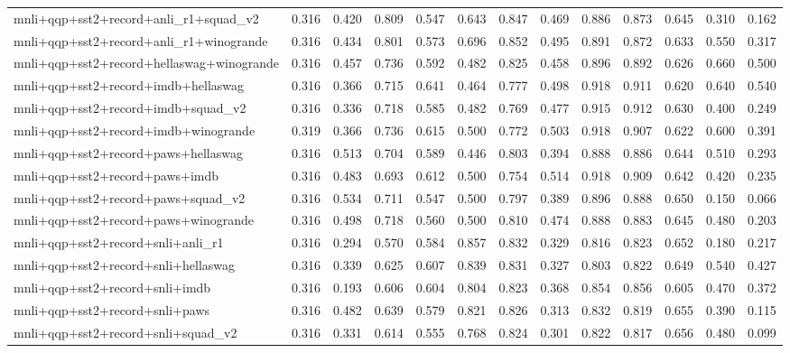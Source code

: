 \begin{table}[t]
\begin{tabular}{lrrrrrrrrrrrr}
    mnli+qqp+sst2+record+anli\_r1+squad\_v2 & 0.316 & 0.420 & 0.809 & 0.547 & 0.643 & 0.847 & 0.469 & 0.886 & 0.873 & 0.645 & 0.310 & 0.162 \\
    mnli+qqp+sst2+record+anli\_r1+winogrande & 0.316 & 0.434 & 0.801 & 0.573 & 0.696 & 0.852 & 0.495 & 0.891 & 0.872 & 0.633 & 0.550 & 0.317 \\
    mnli+qqp+sst2+record+hellaswag+winogrande & 0.316 & 0.457 & 0.736 & 0.592 & 0.482 & 0.825 & 0.458 & 0.896 & 0.892 & 0.626 & 0.660 & 0.500 \\
    mnli+qqp+sst2+record+imdb+hellaswag & 0.316 & 0.366 & 0.715 & 0.641 & 0.464 & 0.777 & 0.498 & 0.918 & 0.911 & 0.620 & 0.640 & 0.540 \\
    mnli+qqp+sst2+record+imdb+squad\_v2 & 0.316 & 0.336 & 0.718 & 0.585 & 0.482 & 0.769 & 0.477 & 0.915 & 0.912 & 0.630 & 0.400 & 0.249 \\
    mnli+qqp+sst2+record+imdb+winogrande & 0.319 & 0.366 & 0.736 & 0.615 & 0.500 & 0.772 & 0.503 & 0.918 & 0.907 & 0.622 & 0.600 & 0.391 \\
    mnli+qqp+sst2+record+paws+hellaswag & 0.316 & 0.513 & 0.704 & 0.589 & 0.446 & 0.803 & 0.394 & 0.888 & 0.886 & 0.644 & 0.510 & 0.293 \\
    mnli+qqp+sst2+record+paws+imdb & 0.316 & 0.483 & 0.693 & 0.612 & 0.500 & 0.754 & 0.514 & 0.918 & 0.909 & 0.642 & 0.420 & 0.235 \\
    mnli+qqp+sst2+record+paws+squad\_v2 & 0.316 & 0.534 & 0.711 & 0.547 & 0.500 & 0.797 & 0.389 & 0.896 & 0.888 & 0.650 & 0.150 & 0.066 \\
    mnli+qqp+sst2+record+paws+winogrande & 0.316 & 0.498 & 0.718 & 0.560 & 0.500 & 0.810 & 0.474 & 0.888 & 0.883 & 0.645 & 0.480 & 0.203 \\
    mnli+qqp+sst2+record+snli+anli\_r1 & 0.316 & 0.294 & 0.570 & 0.584 & 0.857 & 0.832 & 0.329 & 0.816 & 0.823 & 0.652 & 0.180 & 0.217 \\
    mnli+qqp+sst2+record+snli+hellaswag & 0.316 & 0.339 & 0.625 & 0.607 & 0.839 & 0.831 & 0.327 & 0.803 & 0.822 & 0.649 & 0.540 & 0.427 \\
    mnli+qqp+sst2+record+snli+imdb & 0.316 & 0.193 & 0.606 & 0.604 & 0.804 & 0.823 & 0.368 & 0.854 & 0.856 & 0.605 & 0.470 & 0.372 \\
    mnli+qqp+sst2+record+snli+paws & 0.316 & 0.482 & 0.639 & 0.579 & 0.821 & 0.826 & 0.313 & 0.832 & 0.819 & 0.655 & 0.390 & 0.115 \\
    mnli+qqp+sst2+record+snli+squad\_v2 & 0.316 & 0.331 & 0.614 & 0.555 & 0.768 & 0.824 & 0.301 & 0.822 & 0.817 & 0.656 & 0.480 & 0.099 \\

\end{tabular}
\end{table}
